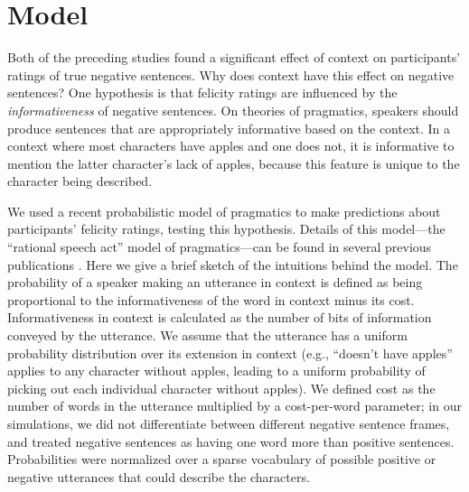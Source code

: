 \documentclass[man, noapacite]{apa2}
\begin{document}
\section{Model}

Both of the preceding studies found a significant effect of context on participants' ratings of true negative sentences.  Why does context have this effect on negative sentences?  One hypothesis is that felicity ratings are influenced by the \emph{informativeness} of negative sentences. On theories of pragmatics, speakers should produce sentences that are appropriately informative based on the context.  In a context where most characters have apples and one does not, it is informative to mention the latter character's lack of apples, because this feature is unique to the character being described.

We used a recent probabilistic model of pragmatics to make predictions about participants' felicity ratings, testing this hypothesis. Details of this model---the ``rational speech act'' model of pragmatics---can be found in several previous publications \cite{frank2012,goodman2013,nordmeyer2014}. Here we give a brief sketch of the intuitions behind the model. The probability of a speaker making an utterance in context is defined as being  proportional to the informativeness of the word in context minus its cost.  Informativeness in context is calculated as the number of bits of information conveyed by the utterance.  We assume that the utterance has a uniform probability distribution over its extension in context (e.g., ``doesn't have apples'' applies to any character without apples, leading to a uniform probability of picking out each individual character without apples). We defined cost as the number of words in the utterance multiplied by a cost-per-word parameter; in our simulations, we did not differentiate between different negative sentence frames, and treated negative sentences as having one word more than positive sentences.  Probabilities were normalized over a sparse vocabulary of possible positive or negative utterances that could describe the characters.
\end{document}
